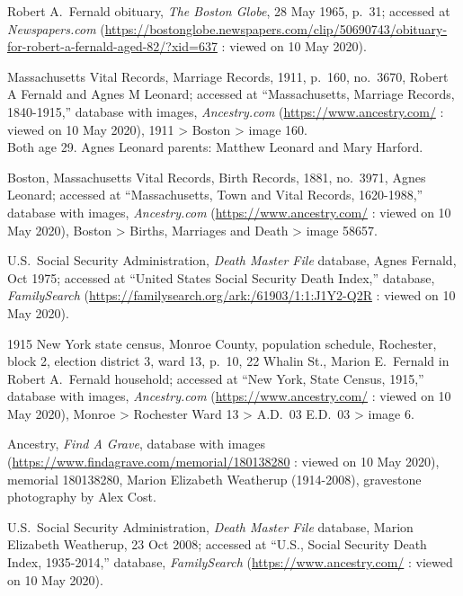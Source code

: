 \begin{thebibliography}{999}
	Robert A.\ Fernald obituary, \textit{The Boston Globe}, 28 May 1965, p.\ 31; accessed at \textit{Newspapers.com} (\url{https://bostonglobe.newspapers.com/clip/50690743/obituary-for-robert-a-fernald-aged-82/?xid=637} : viewed on 10 May 2020).
	
	Massachusetts Vital Records, Marriage Records, 1911, p.\ 160, no.\ 3670, Robert A Fernald and Agnes M Leonard; accessed at ``Massachusetts, Marriage Records, 1840-1915,'' database with images, \textit{Ancestry.com} (\url{https://www.ancestry.com/} : viewed on 10 May 2020), 1911 > Boston > image 160.\\
	Both age 29. Agnes Leonard parents: Matthew Leonard and Mary Harford.
	
	Boston, Massachusetts Vital Records, Birth Records, 1881, no.\ 3971, Agnes Leonard; accessed at ``Massachusetts, Town and Vital Records, 1620-1988,'' database with images, \textit{Ancestry.com} (\url{https://www.ancestry.com/} : viewed on 10 May 2020), Boston > Births, Marriages and Death > image 58657.
	
	U.S.\ Social Security Administration, \textit{Death Master File} database, Agnes Fernald, Oct 1975; accessed at ``United States Social Security Death Index,'' database, \textit{FamilySearch} (\url{https://familysearch.org/ark:/61903/1:1:J1Y2-Q2R} : viewed on 10 May 2020).
	
	1915 New York state census, Monroe County, population schedule, Rochester, block 2, election district 3, ward 13, p.\ 10, 22 Whalin St., Marion E.\ Fernald in Robert A.\ Fernald household; accessed at ``New York, State Census, 1915,'' database with images, \textit{Ancestry.com} (\url{https://www.ancestry.com/} : viewed on 10 May 2020), Monroe > Rochester Ward 13 > A.D.\ 03 E.D.\ 03 > image 6.
	
	Ancestry, \textit{Find A Grave}, database with images (\url{https://www.findagrave.com/memorial/180138280} : viewed on 10 May 2020), memorial 180138280, Marion Elizabeth Weatherup (1914-2008), gravestone photography by Alex Cost.
	
	U.S.\ Social Security Administration, \textit{Death Master File} database, Marion Elizabeth Weatherup, 23 Oct 2008; accessed at ``U.S., Social Security Death Index, 1935-2014,'' database, \textit{FamilySearch} (\url{https://www.ancestry.com/} : viewed on 10 May 2020).
	

\end{thebibliography}
